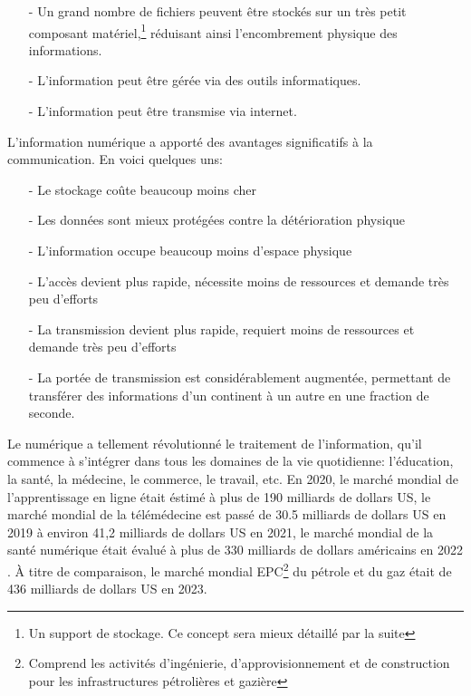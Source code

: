 \begin{itemize}
	\item[-] Un grand nombre de fichiers peuvent \^etre stock\'es sur un tr\`es petit composant mat\'eriel,\footnote{Un support de stockage. Ce concept sera mieux d\'etaill\'e par la suite} r\'eduisant ainsi l'encombrement physique des informations.
	\item[-] L'information peut \^etre g\'er\'ee via des outils informatiques.
	\item[-] L'information peut \^etre transmise via internet.\\
\end{itemize}

\vspace{0.5cm}

L'information num\'erique a apport\'e des avantages significatifs \`a la communication. En voici quelques uns:\\
\begin{itemize}
	\item[-] Le stockage co\^ute beaucoup moins cher
	\item[-] Les donn\'ees sont mieux prot\'eg\'ees contre la d\'et\'erioration physique
	\item[-] L'information occupe beaucoup moins d'espace physique
	\item[-] L'acc\`es devient plus rapide, n\'ecessite moins de ressources et demande tr\`es peu d'efforts
	\item[-] La transmission devient plus rapide, requiert moins de ressources et demande tr\`es peu d'efforts
	\item[-] La port\'ee de transmission est consid\'erablement augment\'ee, permettant de transf\'erer des informations d'un continent \`a un autre en une fraction de seconde.
\end{itemize}

\vspace{1cm}

\noindent Le num\'erique a tellement r\'evolutionn\'e le traitement de l'information, qu'il commence \`a s'int\'egrer dans tous les domaines de la vie quotidienne: l'\'education, la sant\'e, la m\'edecine, le commerce, le travail, etc.  En 2020, le march\'e mondial de l'apprentissage en ligne \'etait \'estim\'e \`a plus de 190 milliards de dollars US\cite{apprentissageEnLigne2020},  le march\'e mondial de la t\'el\'em\'edecine est pass\'e de 30.5 milliards de dollars US en 2019 \`a environ 41,2 milliards de dollars US en 2021\cite{marcheDeLaTelemedecine}, le march\'e mondial de la sant\'e num\'erique \'etait \'evalu\'e \`a plus de 330 milliards de dollars am\'ericains en 2022 \cite{DonneesSanteElectronique}. \`A titre de comparaison, le march\'e mondial EPC\footnote{Comprend les activit\'es d'ing\'enierie, d'approvisionnement et de construction pour les infrastructures p\'etroli\`eres et gazi\`ere} du p\'etrole et du gaz \'etait de 436 milliards de dollars US en 2023\cite{MarcheMondialPetrole}.

